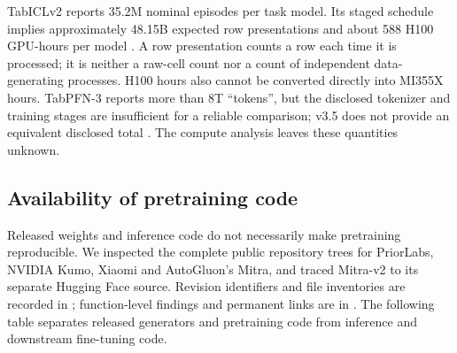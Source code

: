 \documentclass[11pt]{article}
\begin{document}
TabICLv2 reports 35.2M nominal episodes per task model. Its staged schedule implies approximately 48.15B expected row presentations and about 588 H100 GPU-hours per model \cite{tabicl2}. A row presentation counts a row each time it is processed; it is neither a raw-cell count nor a count of independent data-generating processes. H100 hours also cannot be converted directly into MI355X hours. TabPFN-3 reports more than 8T ``tokens'', but the disclosed tokenizer and training stages are insufficient for a reliable comparison; v3.5 does not provide an equivalent disclosed total \cite{tabpfn3,tabpfn35}. The compute analysis leaves these quantities unknown.

\subsection{Availability of pretraining code}
\label{sec:repo-release}

Released weights and inference code do not necessarily make pretraining reproducible. We inspected the complete public repository trees for PriorLabs, NVIDIA Kumo, Xiaomi and AutoGluon's Mitra, and traced Mitra-v2 to its separate Hugging Face source. Revision identifiers and file inventories are recorded in ; function-level findings and permanent links are in . The following table separates released generators and pretraining code from inference and downstream fine-tuning code.
\end{document}
